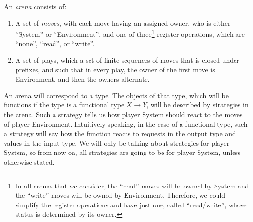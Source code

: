 \begin{definition}[Arena] 
    An \emph{arena} consists of:
    \begin{enumerate}
        \item A set of \emph{moves}, with each move having an assigned owner, who is either ``System'' or ``Environment'', and one of three\footnote{\label{footnote:read-write} In all arenas that we consider, the ``read'' moves will be owned by System and the ``write'' moves will be owned by Environment. Therefore, we could simplify the register operations and have just one, called ``read/write'', whose status is determined by its owner. 
        } register operations, which are ``none'', ``read'', or ``write''.
                \item A set of plays, which a set of finite sequences of moves that is closed under prefixes, and such that in every play, the owner of the first move is Environment, and then the owners alternate.
    \end{enumerate}
\end{definition}




An arena will correspond to a type. The objects of that type, which will be  functions if the type is a functional type $X \to Y$, will be described by strategies in the arena. Such a strategy tells us how player System should react to the moves of player Environment. Intuitively speaking, in the case of a functional type, such a strategy will say how the function reacts to requests in the output type and values in the input type. We will only be talking about strategies for player System, so from now on, all strategies are going to be for player System, unless otherwise stated.


